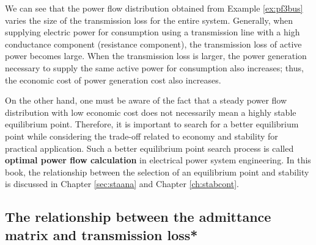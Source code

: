 \documentclass[tombow,dvipdfmx]{corona-a5-1.1}
\begin{document}
We can see that the power flow distribution obtained from Example \ref{ex:pf3bus} varies the size of the transmission loss for the entire system.
Generally, when supplying electric power for consumption using a transmission line with a high conductance component (resistance component), the transmission loss of active power becomes large.
When the transmission loss is larger, the power generation necessary to supply the same active power for consumption also increases; thus, the economic cost of power generation cost also increases.  

On the other hand, one must be aware of the fact that a steady power flow distribution with low economic cost does not necessarily mean a highly stable equilibrium point.
Therefore, it is important to search for a better equilibrium point while considering the trade-off related to economy and stability for practical application.
Such a better equilibrium point search process is called \textbf{optimal power flow calculation} in electrical power system engineering.
In this book, the relationship between the selection of an equilibrium point and stability is discussed in Chapter \ref{sec:staana} and Chapter \ref{ch:stabcont}.

\subsection{The relationship between the admittance matrix and transmission loss*\advanced}
\end{document}
